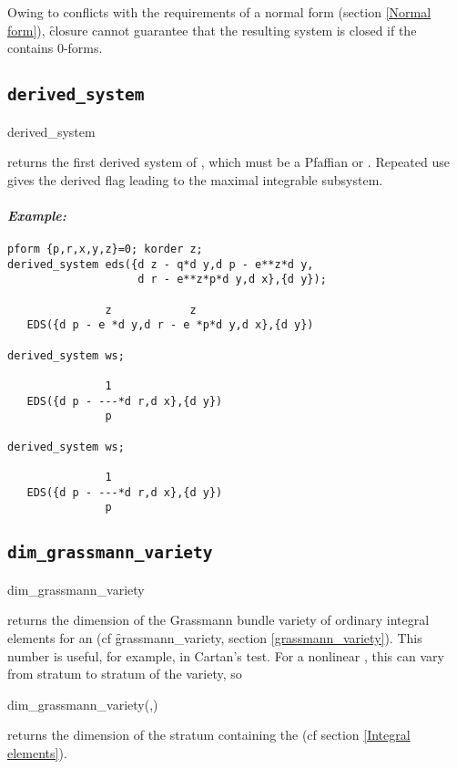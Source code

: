Owing to conflicts with the requirements of a normal form (section
\ref{Normal form}), \f{closure} cannot guarantee that the resulting system
is closed if the  contains 0-forms.

\subsection{\tt derived\_system}
\label{derived_system}

\begin{syntax}
	derived\_system 
\end{syntax}
returns the first derived system of , which must be a Pfaffian
 or . Repeated use gives the derived flag leading to
the maximal integrable subsystem.

\paragraph{\it Example:}
\begin{verbatim}
pform {p,r,x,y,z}=0; korder z;
derived_system eds({d z - q*d y,d p - e**z*d y,
                    d r - e**z*p*d y,d x},{d y});

               z            z
   EDS({d p - e *d y,d r - e *p*d y,d x},{d y}) 

derived_system ws;

               1
   EDS({d p - ---*d r,d x},{d y})
               p 

derived_system ws;

               1
   EDS({d p - ---*d r,d x},{d y})
               p 
\end{verbatim}

\subsection{\tt dim\_grassmann\_variety}
\label{dim_grassmann_variety}

\begin{syntax}
	dim\_grassmann\_variety 
\end{syntax}
returns the dimension of the Grassmann bundle variety of ordinary integral
elements for an  (cf \f{grassmann\_variety}, section
\ref{grassmann_variety}). This number is useful, for example, in Cartan's
test. For a nonlinear , this can vary from stratum to stratum of
the variety, so
\begin{syntax}
	dim\_grassmann\_variety(,)
\end{syntax}
returns the dimension of the stratum containing the 
(cf section \ref{Integral elements}).

